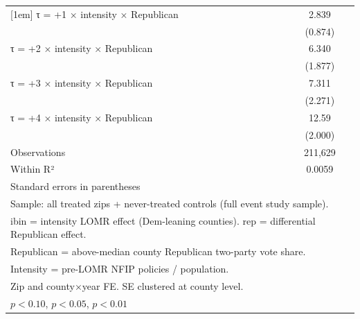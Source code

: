 \begin{table}[htbp]
\begin{tabular}{l*{1}{c}}
[1em]
τ = +1 × intensity × Republican&       2.839\sym{***}\\
                    &     (0.874)         \\
[1em]
τ = +2 × intensity × Republican&       6.340\sym{***}\\
                    &     (1.877)         \\
[1em]
τ = +3 × intensity × Republican&       7.311\sym{***}\\
                    &     (2.271)         \\
[1em]
τ = +4 × intensity × Republican&       12.59\sym{***}\\
                    &     (2.000)         \\
\hline
Observations        &     211,629         \\
Within R²           &      0.0059         \\
\hline\hline
\multicolumn{2}{l}{\footnotesize Standard errors in parentheses}\\
\multicolumn{2}{l}{\footnotesize Sample: all treated zips + never-treated controls (full event study sample).}\\
\multicolumn{2}{l}{\footnotesize ibin = intensity LOMR effect (Dem-leaning counties). rep = differential Republican effect.}\\
\multicolumn{2}{l}{\footnotesize Republican = above-median county Republican two-party vote share.}\\
\multicolumn{2}{l}{\footnotesize Intensity = pre-LOMR NFIP policies / population.}\\
\multicolumn{2}{l}{\footnotesize Zip and county×year FE. SE clustered at county level.}\\
\multicolumn{2}{l}{\footnotesize \sym{*} \(p<0.10\), \sym{**} \(p<0.05\), \sym{***} \(p<0.01\)}\\
\end{tabular}
\end{table}
